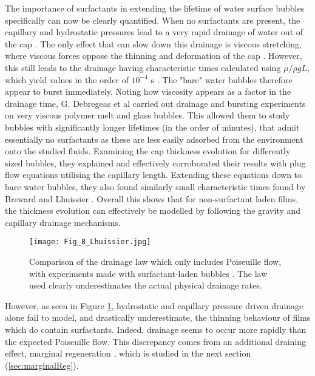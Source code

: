 \documentclass[a4paper,12pt]{article}
\numberwithin{equation}{section}
\numberwithin{figure}{section}
\numberwithin{table}{section}
\begin{document}
The importance of surfactants in extending the lifetime of water surface bubbles specifically can now be clearly quantified. When no surfactants are present, the capillary and hydrostatic pressures lead to a very rapid drainage of water out of the cap \cite{Debregeas1998}. The only effect that can slow down this drainage is viscous stretching, where viscous forces oppose the thinning and deformation of the cap \cite{Lhuissier2011}. However, this still leads to the drainage having characteristic times calculated using $\mu / \rho g L$, which yield values in the order of $10^{-4}$ s \cite{Breward2002, Lhuissier2011}. The "bare" water bubbles therefore appear to burst immediately. Noting how viscosity appears as a factor in the drainage time, G. Debregeas et al \cite{Debregeas1998} carried out drainage and bursting experiments on very viscous polymer melt and glass bubbles. This allowed them to study bubbles with significantly longer lifetimes (in the order of minutes), that admit essentially no surfactants as these are less easily adsorbed from the environment onto the studied fluids. Examining the cap thickness evolution for differently sized bubbles, they explained and effectively corroborated their results with plug flow equations utilising the capillary length. Extending these equations down to bare water bubbles, they also found similarly small characteristic times found by Breward and Lhuissier \cite{Breward2002, Lhuissier2011}. Overall this shows that for non-surfactant laden films, the thickness evolution can effectively be modelled by following the gravity and capillary drainage mechanisms.

\begin{figure}[!htbp]
    \centering
    \captionsetup{width=.9\linewidth}
    \texttt{[image: Fig\_8\_Lhuissier.jpg]}
    \caption{Comparison of the drainage law which only includes Poiseuille flow, with experiments made with surfactant-laden bubbles \cite{Lhuissier2011}. The law used clearly underestimates the actual physical drainage rates.}
    \label{fig:Lhuissier8}
\end{figure}

However, as seen in Figure \ref{fig:Lhuissier8}, hydrostatic and capillary pressure driven drainage alone fail to model, and drastically underestimate, the thinning behaviour of films which do contain surfactants. Indeed, drainage seems to occur more rapidly than the expected Poiseuille flow. This discrepancy comes from an additional draining effect, marginal regeneration \cite{Mysels1959Book}, which is studied in the next section (\ref{sec:marginalReg}).
\end{document}
